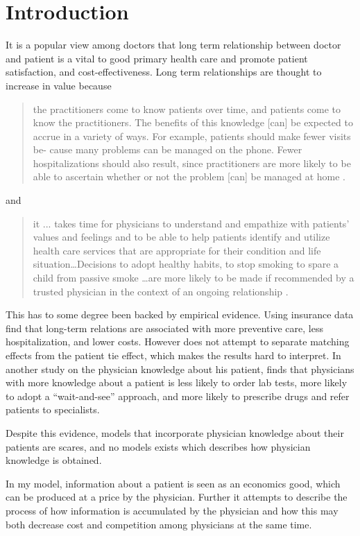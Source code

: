 \documentclass[10pt,a4paper]{article} 					%
\begin{document}
\section{Introduction}
It is a popular view among doctors that long term relationship between doctor and patient is a vital to good primary health care and promote patient satisfaction, and cost-effectiveness. Long term relationships are thought to increase in value because
\begin{quotation}
the practitioners come to know patients over time, and patients come to know the practitioners. The benefits of this knowledge [can] be expected to accrue in a variety of ways. For example, patients should make fewer visits be- cause many problems can be managed on the phone. Fewer hospitalizations should also result, since practitioners are more likely to be able to ascertain whether or not the problem [can] be managed at home \parencite[p. 41--42]{Starfield1992}.
\end{quotation}
and
\begin{quotation}
it ... takes time for physicians to understand and empathize with patients' values and feelings and to be able to help patients identify and utilize health care services that are appropriate for their condition and life situation\ldots Decisions to adopt healthy habits, to stop smoking to spare a child from passive smoke \ldots are more likely to be made if recommended by a trusted physician in the context of an ongoing relationship \parencite[p. 324--235]{Emanuel1995}.
\end{quotation}
This has to some degree been backed by empirical evidence. Using insurance data \textcite{Weiss1996} find that long-term relations are associated with more preventive care, less hospitalization, and lower costs. However \citeauthor{Weiss1996} does not attempt to separate matching effects from the patient tie effect, which makes the results hard to interpret. In another study on the physician knowledge about his patient,   \textcite{Hjortdahl1991}  finds that physicians with more knowledge about a patient is less likely to order lab tests, more likely to adopt a ``wait-and-see'' approach, and more likely to prescribe drugs and refer patients to specialists.

Despite this evidence, models that incorporate physician knowledge about their patients are scares, and no models exists which describes how physician knowledge is obtained.

In my model, information about a patient is seen as an economics good, which can be produced at a price by the physician. Further it attempts to describe the process of how information is accumulated by the physician and how this may both decrease cost and competition among physicians at the same time.
\end{document}

